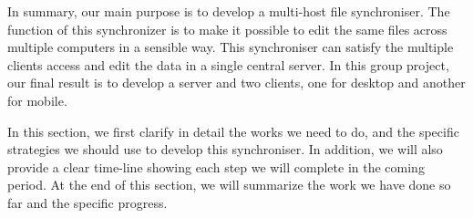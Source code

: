 \noindent In summary, our main purpose is to develop a multi-host file synchroniser.
 The function of this synchronizer is to make it possible to edit the same files across multiple computers in a sensible way. This synchroniser can satisfy the multiple clients access and edit the data in a single central server. In this group project, our final result is to develop a server and two clients, one for desktop and another for mobile.

 \vspace{0.3cm}
 
\noindent In this section, we first clarify in detail the works we need to do, and the specific strategies we should use to develop this synchroniser. In addition, we will also provide a clear time-line showing each step we will complete in the coming period. At the end of this section, we will summarize the work we have done so far and the specific progress.


